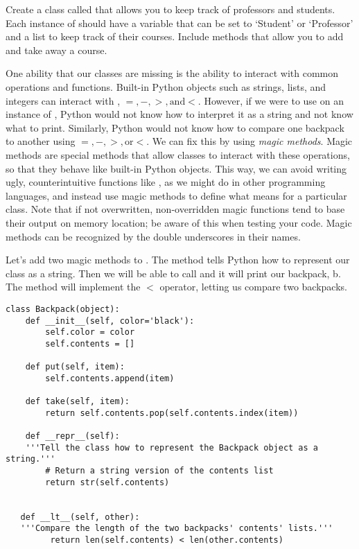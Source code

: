 \begin{problem}
Create a class called  that allows you to keep track of professors and students.
Each instance of  should have a variable that can be set to `Student' or `Professor' and a list to keep track of their courses.
Include methods that allow you to add and take away a course.
\label{prob:School}
\end{problem}

One ability that our classes are missing is the ability to interact with common operations and functions.
Built-in Python objects such as strings, lists, and integers can interact with ,  $ =, - , >, \text{and} <$.
However, if we were to use  on an instance of , Python would not know how to interpret it as a string and not know what to print.
Similarly, Python would not know how to compare one backpack to another using $ =, - , >, \text{or} <$.
We can fix this by using \emph{magic methods}.
Magic methods are special methods that allow classes to interact with these operations, so that they behave like built-in Python objects. This way, we can avoid writing ugly, counterintuitive functions like , as we might do in other programming languages, and instead use magic methods to define what  means for a particular class. Note that if not overwritten, non-overridden magic functions tend to base their output on memory location; be aware of this when testing your code.
Magic methods can be recognized by the double underscores in their names.

Let's add two magic methods to .
The  method tells Python how to represent our class as a string.
Then we will be able to call  and it will print our backpack, b.
The  method will implement the $<$ operator, letting us compare two backpacks.

\begin{lstlisting}
class Backpack(object):
    def __init__(self, color='black'):
    	self.color = color
    	self.contents = []

    def put(self, item):
    	self.contents.append(item)

    def take(self, item):
    	return self.contents.pop(self.contents.index(item))

    def __repr__(self):
    '''Tell the class how to represent the Backpack object as a string.'''
    	# Return a string version of the contents list
        return str(self.contents)


   def __lt__(self, other):
   '''Compare the length of the two backpacks' contents' lists.'''
     	 return len(self.contents) < len(other.contents)

\end{lstlisting}

